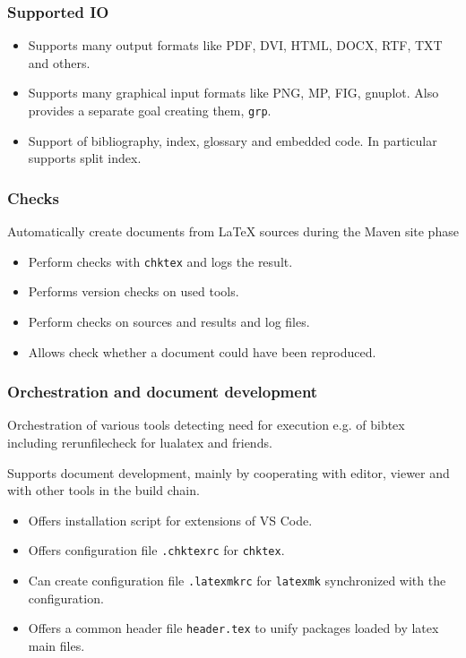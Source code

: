 \begin{frame}
  \frametitle{Supported IO}

  \begin{itemize}
    \item
          Supports many output formats like PDF, DVI, HTML, DOCX, RTF, TXT and others.
    \item
          Supports many graphical input formats like PNG, MP, FIG, gnuplot. 
          Also provides a separate goal creating them, \texttt{grp}.
    \item
          Support of bibliography, index, glossary and embedded code. 
          In particular supports split index.
  \end{itemize}
\end{frame}


\begin{frame}
  \frametitle{Checks}
  Automatically create documents from LaTeX sources during the Maven site phase
  \begin{itemize}
    \item
          Perform checks with \texttt{chktex} and logs the result.
    \item
          Performs version checks on used tools.
    \item
          Perform checks on sources and results and log files.
    \item
          Allows check whether a document could have been reproduced.
  \end{itemize}
\end{frame}

\begin{frame}
  \frametitle{Orchestration and document development}
  Orchestration of various tools detecting need for execution e.g.
  of bibtex including rerunfilecheck for lualatex and friends.

  Supports document development, mainly by cooperating with editor, viewer and with other tools in the build chain.
  \begin{itemize}
    \item Offers installation script for extensions of VS Code.
    \item Offers configuration file \texttt{.chktexrc} for \texttt{chktex}.
    \item Can create configuration file \texttt{.latexmkrc} 
    for \texttt{latexmk} synchronized with the configuration.
    \item Offers a common header file \texttt{header.tex} 
    to unify packages loaded by latex main files.
  \end{itemize}
\end{frame}


